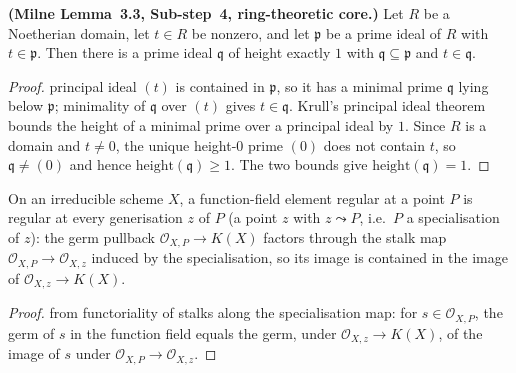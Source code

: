 \begin{lemma}\label{mk-lem:krull_hauptidealsatz_transport}
  \leanok


  \textbf{(Milne Lemma~3.3, Sub-step~4, ring-theoretic core.)} Let \(R\) be a
  Noetherian domain, let \(t \in R\) be nonzero, and let \(\mathfrak p\) be a
  prime ideal of \(R\) with \(t \in \mathfrak p\). Then there is a prime ideal
  \(\mathfrak q\) of height exactly \(1\) with \(\mathfrak q \subseteq
  \mathfrak p\) and \(t \in \mathfrak q\).
\end{lemma}
\begin{proof}
  \leanokThe principal ideal \((t)\) is contained in \(\mathfrak p\), so it has a
  minimal prime \(\mathfrak q\) lying below \(\mathfrak p\); minimality of
  \(\mathfrak q\) over \((t)\) gives \(t \in \mathfrak q\). Krull's principal
  ideal theorem bounds the height of a minimal prime over a principal ideal
  by \(1\). Since \(R\) is a domain and \(t \neq 0\), the unique height-\(0\)
  prime \((0)\) does not contain \(t\), so \(\mathfrak q \neq (0)\) and hence
  \(\mathrm{height}(\mathfrak q) \geq 1\). The two bounds give
  \(\mathrm{height}(\mathfrak q) = 1\).
\end{proof}

\begin{lemma}\label{mk-lem:regular_stalk_propagates_to_generisation}
  \leanok


  On an irreducible scheme \(X\), a function-field element regular at a point
  \(P\) is regular at every generisation \(z\) of \(P\) (a point \(z\) with
  \(z \leadsto P\), i.e.\ \(P\) a specialisation of \(z\)): the germ pullback
  \(\mathcal O_{X,P} \to K(X)\) factors through the stalk map
  \(\mathcal O_{X,P} \to \mathcal O_{X,z}\) induced by the specialisation,
  so its image is contained in the image of \(\mathcal O_{X,z} \to K(X)\).
\end{lemma}
\begin{proof}
  \leanokImmediate from functoriality of stalks along the specialisation map: for
  \(s \in \mathcal O_{X,P}\), the germ of \(s\) in the function field equals
  the germ, under \(\mathcal O_{X,z} \to K(X)\), of the image of \(s\) under
  \(\mathcal O_{X,P} \to \mathcal O_{X,z}\).
\end{proof}

